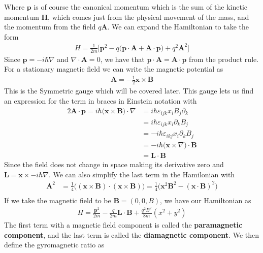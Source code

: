 Where $\textbf{p}$ is of course the canonical momentum which is the sum of the kinetic momentum $\boldsymbol{\Pi}$, which comes just from the physical movement of the mass, and the momentum from the field $q\textbf{A}$. We can expand the Hamiltonian to take the form
\begin{align}
H = \frac{1}{2m}\Big[ \textbf{p}^2 -q\Big(\textbf{p}\cdot \textbf{A} +\textbf{A}\cdot\textbf{p}\Big) + q^2\textbf{A}^2\Big]
\end{align}
Since $\textbf{p} = -i\hbar\nabla$ and $\nabla\cdot\textbf{A} = 0$, we have that $\textbf{p}\cdot\textbf{A}=\textbf{A}\cdot\textbf{p}$ from the product rule. For a stationary magnetic field we can write the magnetic potential as
\begin{align}
\textbf{A} =-\frac{1}{2} \textbf{x}\times\textbf{B}
\end{align}
This is the Symmetric gauge which will be covered later. This gauge lets us find an expression for the term in braces in Einstein notation with
\begin{align}
2\textbf{A}\cdot\textbf{p} = i\hbar\Big(\textbf{x}\times\textbf{B}\Big)\cdot\nabla &= i\hbar \varepsilon_{ijk} x_iB_j\partial_k\\
&= i\hbar \varepsilon_{ijk} x_i\partial_k B_j\\
&= -i\hbar\varepsilon_{ikj}x_i\partial_kB_j\\
&= -i\hbar\Big(\textbf{x}\times\nabla\Big)\cdot\textbf{B}\\
&= \textbf{L}\cdot\textbf{B}
\end{align}
Since the field does not change in space making its derivative zero and $\textbf{L} = \textbf{x}\times-i\hbar\nabla$. We can also simplify the last term in the Hamilonian with
\begin{align}
\textbf{A}^2 &= \frac{1}{4}\Big((\textbf{x}\times\textbf{B})\cdot(\textbf{x}\times\textbf{B})\Big) = \frac{1}{4}\Big(\textbf{x}^2\textbf{B}^2 - (\textbf{x}\cdot\textbf{B})^2\Big)\\
\end{align}
If we take the magnetic field to be $\textbf{B} = (0,0,B)$, we have our Hamiltonian as
\begin{align}
H = \frac{\textbf{p}^2}{2m} -\frac{q}{2m}\textbf{L}\cdot\textbf{B} +\frac{q^2B^2}{8m}(x^2+y^2)
\end{align}
The first term with a magnetic field component is called the \textbf{paramagnetic component}, and the last term is called the \textbf{diamagnetic component}. We then define the gyromagnetic ratio as

